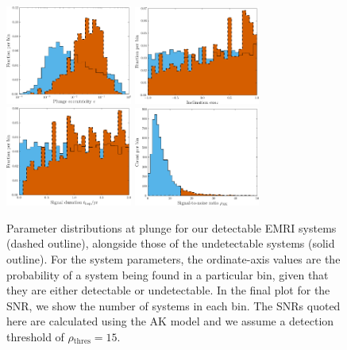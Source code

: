 \documentclass[aps,prd,amsfonts,amssymb,amsmath,nofootinbib,showpacs,superscriptaddress,twocolumn,floatfix]{revtex4-1}
\newcommand{\sub}[1]{\ensuremath{_\mathrm{#1}}}
\begin{document}
\begin{figure}
\includegraphics[width=0.37\textwidth]{Fig_res_pop_e} \quad
\includegraphics[width=0.37\textwidth]{Fig_res_pop_iota} \\ \vspace{0.1cm}
\includegraphics[width=0.37\textwidth]{Fig_res_pop_t} \quad
\includegraphics[width=0.37\textwidth]{Fig_res_pop_SNR}
\caption{\label{fig:EMRIpar-dists}Parameter distributions at plunge for our detectable EMRI systems (dashed outline), alongside those of the undetectable systems (solid outline). For the system parameters, the ordinate-axis values are the probability of a system being found in a particular bin, given that they are either detectable or undetectable. In the final plot for the SNR, we show the number of systems in each bin. The SNRs quoted here are calculated using the AK model and we assume a detection threshold of $\rho\sub{thres} = 15$.}
\end{figure}
\end{document}

